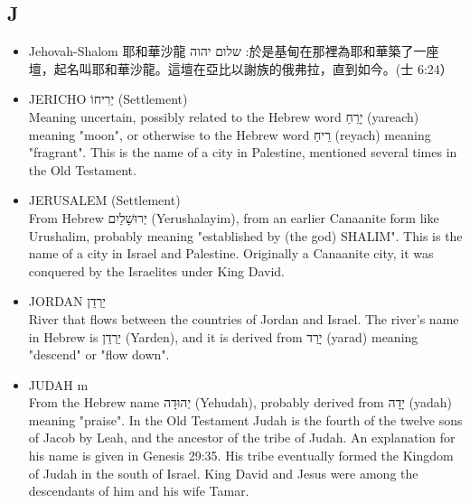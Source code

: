 \subsection{J}
\begin{itemize} 
\itemsep-.25em 
\item Jehovah-Shalom 耶和華沙龍  שלום יהוה  :於是基甸在那裡為耶和華築了一座壇，起名叫耶和華沙龍。這壇在亞比以謝族的俄弗拉，直到如今。(士 6:24）\\ 
\item JERICHO יְרִיחוֹ (Settlement) \\
Meaning uncertain, possibly related to the Hebrew word יָרֵחַ (yareach) meaning "moon", or otherwise to the Hebrew word רֵיחַ (reyach) meaning "fragrant". This is the name of a city in Palestine, mentioned several times in the Old Testament.
\item JERUSALEM (Settlement) \\
From Hebrew יְרוּשָׁלַיִם (Yerushalayim), from an earlier Canaanite form like Urushalim, probably meaning "established by (the god) SHALIM". This is the name of a city in Israel and Palestine. Originally a Canaanite city, it was conquered by the Israelites under King David. 
\item JORDAN יַרְדֵן \\
River that flows between the countries of Jordan and Israel. The river's name in Hebrew is יַרְדֵן (Yarden), and it is derived from יָרַד (yarad) meaning "descend" or "flow down". 
\item JUDAH m \\
From the Hebrew name יְהוּדָה (Yehudah), probably derived from יָדָה (yadah) meaning "praise". In the Old Testament Judah is the fourth of the twelve sons of Jacob by Leah, and the ancestor of the tribe of Judah. An explanation for his name is given in Genesis 29:35. His tribe eventually formed the Kingdom of Judah in the south of Israel. King David and Jesus were among the descendants of him and his wife Tamar.
\end{itemize} 

